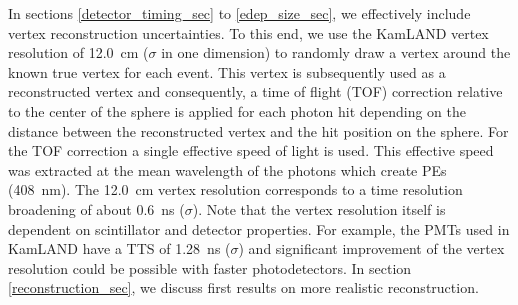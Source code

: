 \documentclass[aps,prc,twocolumn,groupedaddress,showpacs,amsmath,amssymb,floatfix,superscriptaddress]{revtex4}
\begin{document}
In sections \ref{detector_timing_sec} to \ref{edep_size_sec}, we effectively include vertex reconstruction uncertainties. To this end, we use the KamLAND vertex resolution of 12.0~cm \cite{tbd} ($\sigma$ in one dimension) to randomly draw a vertex around the known true vertex for each event. This vertex is subsequently used as a reconstructed vertex and consequently, a time of flight (TOF) correction relative to the center of the sphere is applied for each photon hit depending on the distance between the reconstructed vertex and the hit position on the sphere. For the TOF correction a single effective speed of light is used. This effective speed was extracted at the mean wavelength of the photons which create PEs (408~nm). The 12.0~cm vertex resolution corresponds to a time resolution broadening of about 0.6~ns ($\sigma$). Note that the vertex resolution itself is dependent on scintillator and detector properties. For example, the PMTs used in KamLAND have a TTS of 1.28~ns ($\sigma$) and significant improvement of the vertex resolution could be possible with faster photodetectors. In section \ref{reconstruction_sec}, we discuss first results on more realistic reconstruction.
\end{document}
